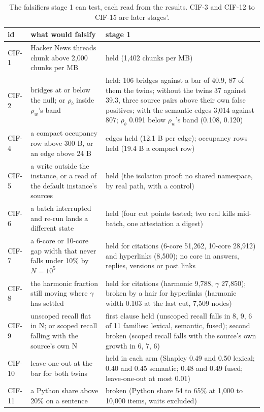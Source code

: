 \documentclass[11pt]{article}
\theoremstyle{plain}
\theoremstyle{definition}
\theoremstyle{remark}
\begin{document}
\begin{table}[ht]
\centering\footnotesize
\begin{tabular}{l p{} p{}}
\toprule
id & what would falsify & stage 1\\
\midrule
CIF-1 & Hacker News threads chunk above 2,000 chunks per MB & held (1,402 chunks per MB)\\
CIF-2 & bridges at or below the null; or $\rho_b$ inside $\rho_w$'s band & held: 106 bridges against a bar of 40.9, 87 of them the twins; without the twins 37 against 39.3, three source pairs above their own false positives; with the semantic edges 3,014 against 807; $\rho_b$ 0.091 below $\rho_w$'s band (0.108, 0.120)\\
CIF-4 & a compact occupancy row above 300 B, or an edge above 24 B & edges held (12.1 B per edge); occupancy rows held (19.4 B a compact row)\\
CIF-5 & a write outside the instance, or a read of the default instance's sources & held (the isolation proof: no shared namespace, by real path, with a control)\\
CIF-6 & a batch interrupted and re-run lands a different state & held (four cut points tested; two real kills mid-batch, one attestation a digest)\\
CIF-7 & a 6-core or 10-core gap width that never falls under 10\% by $N=10^5$ & held for citations (6-core 51,262, 10-core 28,912) and hyperlinks (8,500); no core in answers, replies, versions or post links\\
CIF-8 & the harmonic fraction still moving where $\gamma$ has settled & held for citations (harmonic 9,788, $\gamma$ 27,850); broken by a hair for hyperlinks (harmonic width 0.103 at the last cut, 7,509 nodes)\\
CIF-9 & unscoped recall flat in N; or scoped recall falling with the source's own N & first clause held (unscoped recall falls in 8, 9, 6 of 11 families: lexical, semantic, fused); second broken (scoped recall falls with the source's own growth in 6, 7, 6)\\
CIF-10 & leave-one-out at the bar for both twins & held in each arm (Shapley 0.49 and 0.50 lexical; 0.40 and 0.45 semantic; 0.48 and 0.49 fused; leave-one-out at most 0.01)\\
CIF-11 & a Python share above 20\% on a sentence & broken (Python share 54 to 65\% at 1,000 to 10,000 items, waits excluded)\\
\bottomrule
\end{tabular}
\caption{The falsifiers stage 1 can test, each read from the results. CIF-3 and CIF-12 to CIF-15 are later stages'.}
\label{tab:falsifiers}
\end{table}
\end{document}
